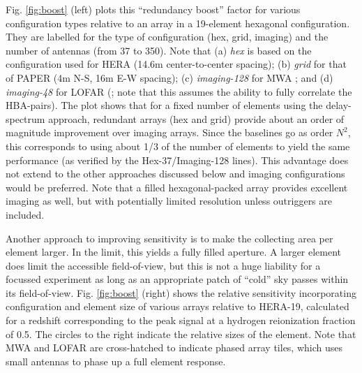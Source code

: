 \documentclass[preprint,11pt]{aastex}
\begin{document}
Fig. \ref{fig:boost} (left) plots this ``redundancy boost'' factor for various configuration types relative to an array in a 19-element hexagonal configuration.  They are labelled for the type of configuration (hex, grid, imaging) and the number of antennas (from 37 to 350).  Note that (a) {\em hex} is based on the configuration used for HERA (14.6m center-to-center spacing); (b) {\em grid} for that of PAPER (4m N-S, 16m E-W spacing); (c) {\em imaging-128} for MWA \citep{tingay_et_al2013}; and (d) {\em imaging-48} for LOFAR (\citealt{2013A&A...556A...2V}; note that this assumes the ability to fully correlate the HBA-pairs).  The plot shows that for a fixed number of elements using the delay-spectrum approach, redundant arrays (hex and grid) provide about an order of magnitude improvement over imaging arrays.  Since the baselines go as order $N^2$, this corresponds to using about 1/3 of the number of elements to yield the same performance (as verified by the Hex-37/Imaging-128 lines).  This advantage does not extend to the other approaches discussed below and imaging configurations would be preferred.  Note that a filled hexagonal-packed array provides excellent imaging as well, but with potentially limited resolution unless outriggers are included.

Another approach to improving sensitivity is to make the collecting area per element larger.  In the limit, this yields a fully filled aperture.  A larger element does limit the accessible field-of-view, but this is not a huge liability for a focussed experiment as long as an appropriate patch of ``cold'' sky passes within its field-of-view.   Fig. \ref{fig:boost} (right) shows the relative sensitivity incorporating configuration and element size of various arrays relative to HERA-19, calculated for a redshift corresponding to the peak signal at a hydrogen reionization fraction of 0.5.  The circles to the right indicate the relative sizes of the element.  Note that MWA and LOFAR are cross-hatched to indicate phased array tiles, which uses small antennas to phase up a full element response.
\end{document}
